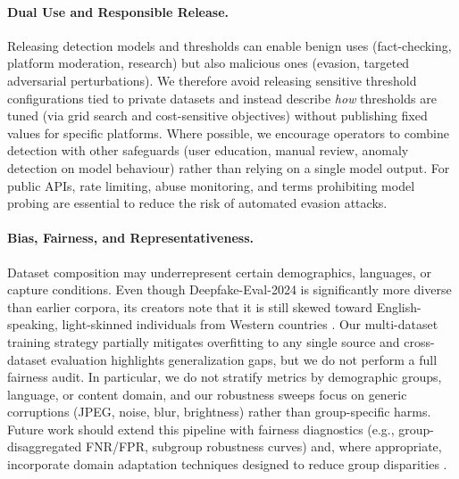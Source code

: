 \paragraph{Dual Use and Responsible Release.} Releasing detection models and thresholds can enable benign uses (fact\hyp checking, platform moderation, research) but also malicious ones (evasion, targeted adversarial perturbations). We therefore avoid releasing sensitive threshold configurations tied to private datasets and instead describe \emph{how} thresholds are tuned (via grid search and cost\hyp sensitive objectives) without publishing fixed values for specific platforms. Where possible, we encourage operators to combine detection with other safeguards (user education, manual review, anomaly detection on model behaviour) rather than relying on a single model output. For public APIs, rate limiting, abuse monitoring, and terms prohibiting model probing are essential to reduce the risk of automated evasion attacks.

\paragraph{Bias, Fairness, and Representativeness.} Dataset composition may underrepresent certain demographics, languages, or capture conditions. Even though Deepfake\hyp Eval\hyp 2024 is significantly more diverse than earlier corpora, its creators note that it is still skewed toward English\hyp speaking, light\hyp skinned individuals from Western countries \cite{deepeval2024}. Our multi\hyp dataset training strategy partially mitigates overfitting to any single source and cross\hyp dataset evaluation highlights generalization gaps, but we do not perform a full fairness audit. In particular, we do not stratify metrics by demographic groups, language, or content domain, and our robustness sweeps focus on generic corruptions (JPEG, noise, blur, brightness) rather than group\hyp specific harms. Future work should extend this pipeline with fairness diagnostics (e.g., group\hyp disaggregated FNR/FPR, subgroup robustness curves) and, where appropriate, incorporate domain adaptation techniques designed to reduce group disparities \cite{pei2024deepfakesurvey}.

